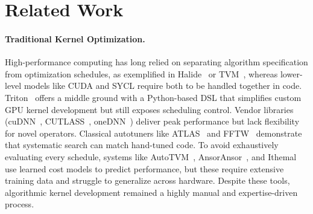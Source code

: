 %
%
%
%

\section{Related Work} \label{sec:related}
\paragraph{Traditional Kernel Optimization.}
High-performance computing has long relied on separating algorithm specification from optimization schedules, as exemplified in  Halide~\citep{ragan2013halide} or TVM~\citep{chen2018tvm}, whereas lower-level models like CUDA and SYCL require both to be handled together in code. Triton~\citep{tillet2019triton} offers a middle ground with a Python-based DSL that simplifies custom GPU kernel development but still exposes scheduling control.
Vendor libraries (cuDNN~\citep{chetlur2014cudnn}, CUTLASS~\citep{cutlass}, oneDNN~\citep{onednn}) deliver peak performance but lack flexibility for novel operators. Classical autotuners like ATLAS~\citep{whaley2001automated} and FFTW~\citep{frigo1998fftw} demonstrate that systematic search can match hand-tuned code. To avoid exhaustively evaluating every schedule, systems like AutoTVM~\citep{chen2018learning}, AnsorAnsor~\citep{zheng2020ansor}, and Ithemal~\citep{mendis2019ithemal} use learned cost models to predict performance, but these require extensive training data and struggle to generalize across hardware. Despite these tools, algorithmic kernel development remained a highly manual and expertise-driven process.

